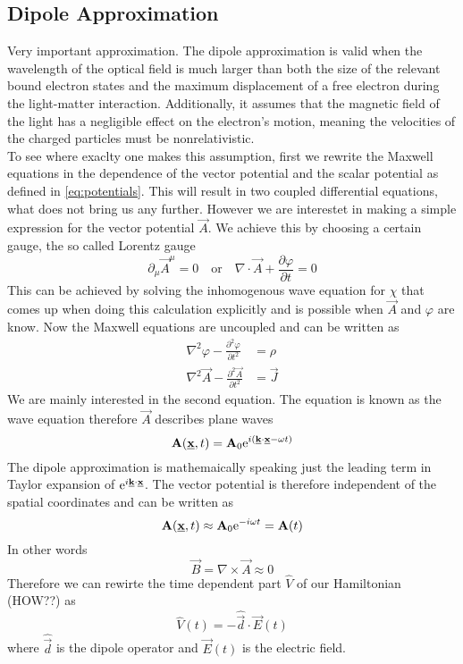 \subsection{Dipole Approximation}
Very important approximation. 
The dipole approximation is valid when the wavelength of the optical field is much larger than both the size of the relevant bound electron states and the maximum displacement of a free electron during the light-matter interaction. 
Additionally, it assumes that the magnetic field of the light has a negligible effect on the electron's motion, meaning the velocities of the charged particles must be nonrelativistic. \\
To see where exaclty one makes this assumption, first we rewrite the Maxwell equations in the dependence of the vector potential and the scalar potential as defined in \eqref{eq:potentials}. 
This will result in two coupled differential equations, what does not bring us any further. 
However we are interestet in making a simple expression for the vector potential $\vec{A}$.
We achieve this by choosing a certain gauge, the so called Lorentz gauge
\begin{equation*}
    \partial_{\mu} \vec{A}^{\mu} = 0 \quad \text{or} \quad \nabla \cdot \vec{A} + \frac{\partial \varphi}{\partial t} = 0
\end{equation*}
This can be achieved by solving the inhomogenous wave equation for $\chi$ that comes up when doing this calculation explicitly and is possible when $\vec{A}$ and $\varphi$ are know.
Now the Maxwell equations are uncoupled and can be written as
\begin{equation*}
    \begin{aligned}
        \nabla^2 \varphi - \frac{\partial^2 \varphi}{\partial t^2} &= \rho \\
        \nabla^2 \vec{A} - \frac{\partial^2 \vec{A}}{\partial t^2} &= \vec{J} 
    \end{aligned}
\end{equation*}
We are mainly interested in the second equation. The equation is known as the wave equation therefore $\vec{A}$ describes plane waves
\begin{equation*}
    \mathbf{A}(\underline{\mathbf{x}}, t) = \mathbf{A}_0 \mathrm{e}^{i (\underline{\mathbf{k}} \cdot \underline{\mathbf{x}} - \omega t)}
\end{equation*}
The dipole approximation is mathemaically speaking just the leading term in Taylor expansion of $\mathrm{e}^{i\underline{\mathbf{k}} \cdot \underline{\mathbf{x}}}$. The vector potential is therefore independent of the spatial coordinates and can be written as
\begin{equation*}
    \mathbf{A}(\underline{\mathbf{x}}, t) \approx \mathbf{A}_0 \mathrm{e}^{- i \omega t} = \mathbf{A}(t)
\end{equation*}
In other words
\begin{equation*}
    \vec{B} = \nabla \times \vec{A} \approx 0
\end{equation*}
Therefore we can rewirte the time dependent part $\hat{V}$ of our Hamiltonian (HOW??) as
\begin{equation*}
    \hat{V}(t) = -\hat{\vec{d}} \cdot \vec{E}(t)
\end{equation*}
where $\hat{\vec{d}}$ is the dipole operator and $\vec{E}(t)$ is the electric field.




